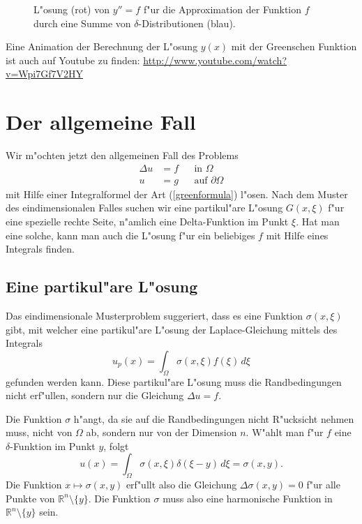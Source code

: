 \begin{beispiel}
\begin{figure}
\begin{center}
\end{center}
\caption{L"osung (rot) von $y''=f$ f"ur die Approximation der Funktion $f$
durch eine Summe von $\delta$-Distributionen (blau).
\label{elliptisch:green-beispiele}}
\end{figure}

Eine Animation der Berechnung der L"osung $y(x)$ mit der Greenschen
Funktion ist auch auf Youtube zu finden: \url{http://www.youtube.com/watch?v=Wpi7Gf7V2HY}
\end{beispiel}

\section{Der allgemeine Fall}
Wir m"ochten jetzt den allgemeinen Fall des Problems
\begin{align*}
\Delta u&=f&&\text{in $\Omega$}\\
u&=g&&\text{auf $\partial\Omega$}
\end{align*}
mit Hilfe einer Integralformel der Art (\ref{greenformula}) 
l"osen. Nach dem Muster des eindimensionalen Falles suchen
wir eine partikul"are L"osung $G(x,\xi)$ f"ur eine spezielle rechte Seite,
n"amlich eine Delta-Funktion im Punkt $\xi$.  Hat man eine
solche, kann man auch die L"osung f"ur ein beliebiges $f$ mit
Hilfe eines Integrals finden.


\subsection{Eine partikul"are L"osung}
Das eindimensionale Musterproblem suggeriert, dass es eine
Funktion $\sigma(x,\xi)$ gibt, mit welcher eine partikul"are L"osung
der Laplace-Gleichung mittels des Integrals
\begin{equation}
u_p(x)=\int_\Omega \sigma(x,\xi)  f(\xi)\,d\xi
\label{singulaereloesunglaplace}
\end{equation}
gefunden werden kann.
Diese partikul"are L"osung muss die Randbedingungen nicht erf"ullen,
sondern nur die Gleichung $\Delta u=f$.

Die Funktion $\sigma$ h"angt, da sie auf die Randbedingungen nicht 
R"ucksicht nehmen muss, nicht von $\Omega$ ab, sondern nur von der
Dimension $n$.
W"ahlt man f"ur $f$ eine $\delta$-Funktion im Punkt $y$, folgt
\[
u(x)
=
\int_\Omega \sigma(x,\xi)\delta(\xi - y)\,d\xi
=
\sigma(x,y).
\]
Die Funktion $x\mapsto \sigma(x,y)$ erf"ullt also die Gleichung
$\Delta \sigma(x,y)=0$ f"ur alle Punkte von ${\mathbb R}^n\setminus\{y\}$.
Die Funktion $\sigma$ muss also eine harmonische Funktion in 
$\mathbb R^n\setminus\{y\}$ sein.

